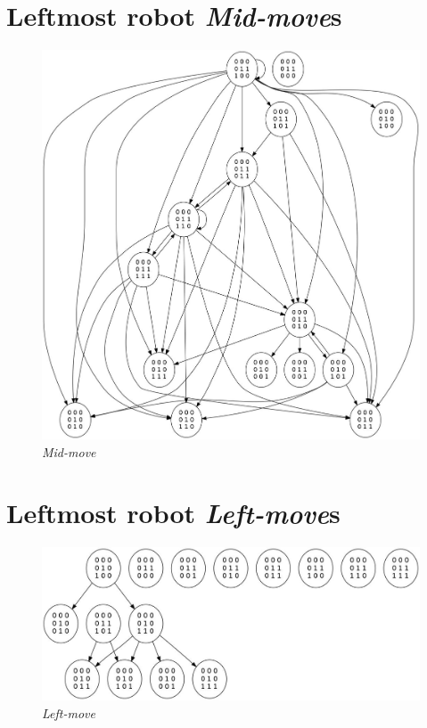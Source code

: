 \documentclass[11pt, a4paper]{article}
\theoremstyle{plain}
\theoremstyle{definition}
\theoremstyle{remark}
\begin{document}
\section{Leftmost robot \emph{Mid-move}s}
\begin{figure}[H]
\includegraphics[scale=0.40]{graph_images/graph_leftmost_mid.jpg}
\caption{\emph{Mid-move}}
\label{graph:leftmost_mid}
\end{figure}

\section{Leftmost robot \emph{Left-move}s}
\begin{figure}[H]
\includegraphics[scale=0.50]{graph_images/graph_leftmost_left.jpg}
\caption{\emph{Left-move}}
\label{graph:leftmost_left}
\end{figure}
\end{document}
